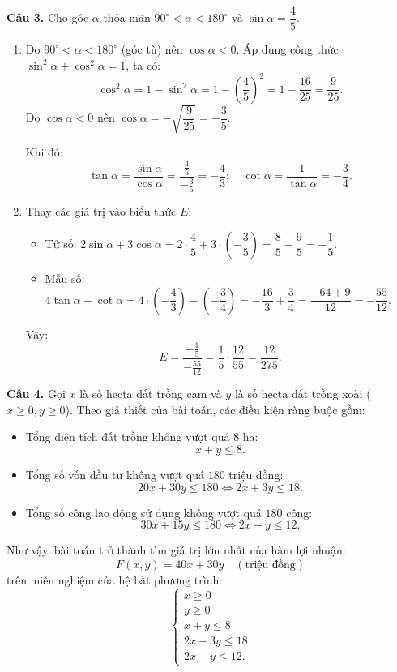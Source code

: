 \documentclass[12pt,a4paper]{article}
\begin{document}
\textbf{Câu 3.} Cho góc $\alpha$ thỏa mãn $90^\circ < \alpha < 180^\circ$ và $\sin \alpha = \dfrac{4}{5}$.
\begin{enumerate}
    \item Do $90^\circ < \alpha < 180^\circ$ (góc tù) nên $\cos \alpha < 0$.
    Áp dụng công thức $\sin^2 \alpha + \cos^2 \alpha = 1$, ta có:
    \[
    \cos^2 \alpha = 1 - \sin^2 \alpha = 1 - \left(\frac{4}{5}\right)^2 = 1 - \frac{16}{25} = \frac{9}{25}.
    \]
    Do $\cos \alpha < 0$ nên $\cos \alpha = -\sqrt{\dfrac{9}{25}} = -\dfrac{3}{5}$.
    
    Khi đó:
    \[
    \tan \alpha = \frac{\sin \alpha}{\cos \alpha} = \frac{\frac{4}{5}}{-\frac{3}{5}} = -\frac{4}{3}; \quad \cot \alpha = \frac{1}{\tan \alpha} = -\frac{3}{4}.
    \]
    \item Thay các giá trị vào biểu thức $E$:
    \begin{itemize}[leftmargin=0.5cm, itemsep=1pt, topsep=1pt]
        \item Tử số: $2\sin \alpha + 3\cos \alpha = 2 \cdot \dfrac{4}{5} + 3 \cdot \left(-\dfrac{3}{5}\right) = \dfrac{8}{5} - \dfrac{9}{5} = -\dfrac{1}{5}$.
        \item Mẫu số: $4\tan \alpha - \cot \alpha = 4 \cdot \left(-\dfrac{4}{3}\right) - \left(-\dfrac{3}{4}\right) = -\dfrac{16}{3} + \dfrac{3}{4} = \dfrac{-64 + 9}{12} = -\dfrac{55}{12}$.
    \end{itemize}
    Vậy:
    \[
    E = \frac{-\frac{1}{5}}{-\frac{55}{12}} = \frac{1}{5} \cdot \frac{12}{55} = \frac{12}{275}.
    \]
\end{enumerate}

\textbf{Câu 4.}
Gọi $x$ là số hecta đất trồng cam và $y$ là số hecta đất trồng xoài ($x \ge 0, y \ge 0$).
Theo giả thiết của bài toán, các điều kiện ràng buộc gồm:
\begin{itemize}[leftmargin=0.5cm, itemsep=1pt, topsep=1pt]
    \item Tổng diện tích đất trồng không vượt quá $8\text{ ha}$:
    \[
    x + y \le 8.
    \]
    \item Tổng số vốn đầu tư không vượt quá $180$ triệu đồng:
    \[
    20x + 30y \le 180 \iff 2x + 3y \le 18.
    \]
    \item Tổng số công lao động sử dụng không vượt quá $180$ công:
    \[
    30x + 15y \le 180 \iff 2x + y \le 12.
    \]
\end{itemize}
Như vậy, bài toán trở thành tìm giá trị lớn nhất của hàm lợi nhuận:
\[
F(x, y) = 40x + 30y \quad (\text{triệu đồng})
\]
trên miền nghiệm của hệ bất phương trình:
\[
\begin{cases}
x \ge 0 \\
y \ge 0 \\
x + y \le 8 \\
2x + 3y \le 18 \\
2x + y \le 12.
\end{cases}
\]
\end{document}
